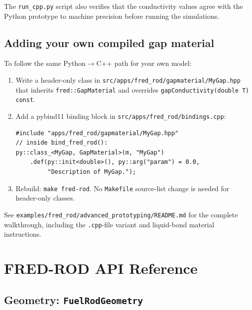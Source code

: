 \documentclass[11pt,a4paper]{article}
\begin{document}
The \texttt{run\_cpp.py} script also verifies that the conductivity values
agree with the Python prototype to machine precision before running the
simulations.

\subsection{Adding your own compiled gap material}

To follow the same Python$\to$C++ path for your own model:

\begin{enumerate}
  \item Write a header-only class in
        \texttt{src/apps/fred\_rod/gapmaterial/MyGap.hpp}
        that inherits \texttt{fred::GapMaterial} and overrides
        \texttt{gapConductivity(double T) const}.
  \item Add a pybind11 binding block in
        \texttt{src/apps/fred\_rod/bindings.cpp}:
        \begin{lstlisting}
#include "apps/fred_rod/gapmaterial/MyGap.hpp"
// inside bind_fred_rod():
py::class_<MyGap, GapMaterial>(m, "MyGap")
    .def(py::init<double>(), py::arg("param") = 0.0,
         "Description of MyGap.");
        \end{lstlisting}
  \item Rebuild: \texttt{make fred-rod}.
        No \texttt{Makefile} source-list change is needed for header-only classes.
\end{enumerate}

See \texttt{examples/fred\_rod/advanced\_prototyping/README.md} for the
complete walkthrough, including the \texttt{.cpp}-file variant and liquid-bond
material instructions.

\section{FRED-ROD API Reference}
\label{sec:api-rod}

\subsection{Geometry: \texttt{FuelRodGeometry}}
\end{document}
